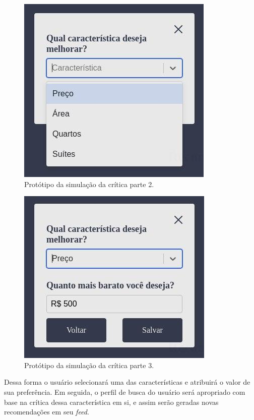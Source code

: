 \begin{figure}[H]
    \centering
    \includegraphics[scale=0.7]{figuras/consideracoes_finais/prototipo_simulacao_critica2.jpg}
    \caption[Protótipo da simulação da crítica parte 2]{Protótipo da simulação da crítica parte 2.}
    \label{fig:prototipo_simulacao_critica2}
\end{figure}

\begin{figure}[H]
    \centering
    \includegraphics[scale=0.7]{figuras/consideracoes_finais/prototipo_simulacao_critica3.jpg}
    \caption[Protótipo da simulação da crítica parte 3]{Protótipo da simulação da crítica parte 3.}
    \label{fig:prototipo_simulacao_critica3}
\end{figure}

Dessa forma o usuário selecionará uma das características e atribuirá o valor de sua preferência. Em seguida, o perfil de busca do usuário será apropriado com base na crítica dessa característica em si, e assim serão geradas novas recomendações em seu \textit{feed}.


